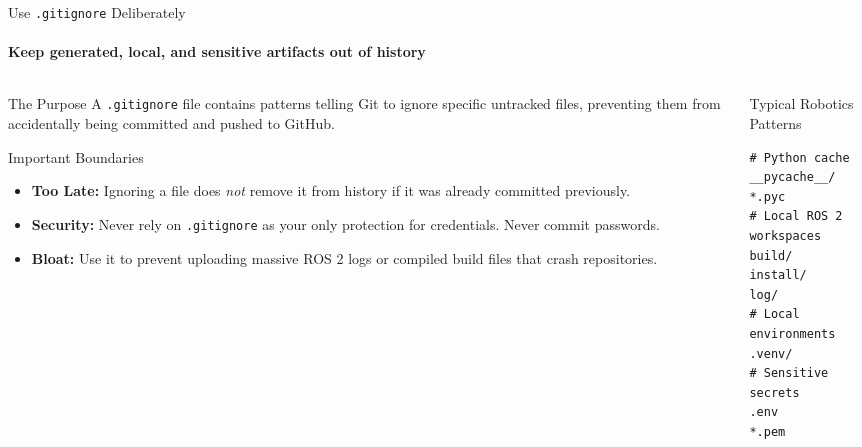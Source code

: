 \begin{frame}[fragile]{Use \texttt{.gitignore} Deliberately}
\framesubtitle{Keep generated, local, and sensitive artifacts out of history}

\footnotesize

\begin{columns}[T,onlytextwidth]

    \begin{column}{0.52\textwidth}
        \begin{block}{The Purpose}
            A \texttt{.gitignore} file contains patterns telling Git to ignore specific untracked files, preventing them from accidentally being committed and pushed to GitHub.
        \end{block}
        
        \begin{alertblock}{Important Boundaries}
            \begin{itemize}
                \setlength{\itemsep}{0.3em}
                \item \textbf{Too Late:} Ignoring a file does \textit{not} remove it from history if it was already committed previously.
                \item \textbf{Security:} Never rely on \texttt{.gitignore} as your only protection for credentials. Never commit passwords.
                \item \textbf{Bloat:} Use it to prevent uploading massive ROS 2 logs or compiled build files that crash repositories.
            \end{itemize}
        \end{alertblock}
    \end{column}

    \begin{column}{0.44\textwidth}
        \begin{exampleblock}{Typical Robotics Patterns}
\begin{verbatim}
# Python cache
__pycache__/
*.pyc
# Local ROS 2 workspaces
build/
install/
log/
# Local environments
.venv/
# Sensitive secrets
.env
*.pem
\end{verbatim}
        \end{exampleblock}
    \end{column}

\end{columns}

\end{frame}

